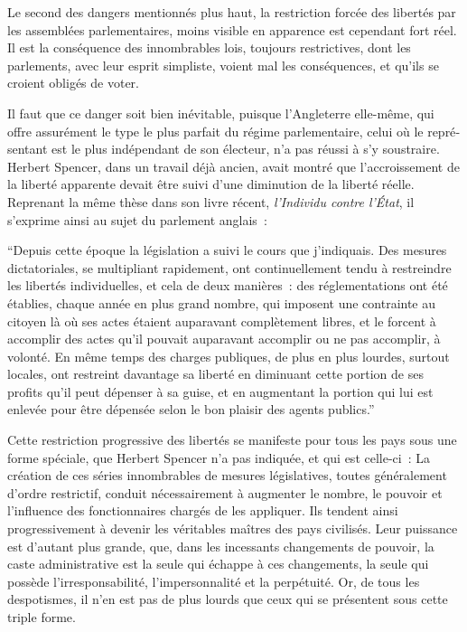 \documentclass[french,twoside]{book} %
\begin{document}
Le second des dangers mentionnés plus haut, la restriction forcée des libertés par les assemblées parlementaires, moins visible en apparence est cependant fort réel. Il est la conséquence des innombrables lois, toujours restrictives, dont les parlements, avec leur esprit simpliste, voient mal les conséquences, et qu’ils se croient obligés de voter.\par
Il faut que ce danger soit bien inévitable, puisque l’Angleterre elle-même, qui offre assurément le type le plus parfait du régime parlementaire, celui où le repré­sentant est le plus indépendant de son électeur, n’a pas réussi à s’y soustraire. Herbert Spencer, dans un travail déjà ancien, avait montré que l’accroissement de la liberté apparente devait être suivi d’une diminution de la liberté réelle. Reprenant la même thèse dans son livre récent, \emph{l’Individu contre l’État}, il s’exprime ainsi au sujet du parlement anglais :\par
“Depuis cette époque la législation a suivi le cours que j’indiquais. Des mesures dictatoriales, se multipliant rapidement, ont continuellement tendu à restreindre les libertés individuelles, et cela de deux manières : des réglementations ont été établies, chaque année en plus grand nombre, qui imposent une contrainte au citoyen là où ses actes étaient auparavant complètement libres, et le forcent à accomplir des actes qu’il pouvait auparavant accomplir ou ne pas accomplir, à volonté. En même temps des charges publiques, de plus en plus lourdes, surtout locales, ont restreint davantage sa liberté en diminuant cette portion de ses profits qu’il peut dépenser à sa guise, et en augmentant la portion qui lui est enlevée pour être dépensée selon le bon plaisir des agents publics.”\par
Cette restriction progressive des libertés se manifeste pour tous les pays sous une forme spéciale, que Herbert Spencer n’a pas indiquée, et qui est celle-ci : La création de ces séries innombrables de mesures législatives, toutes généralement d’ordre restrictif, conduit nécessairement à augmenter le nombre, le pouvoir et l’influence des fonctionnaires chargés de les appliquer. Ils tendent ainsi progressivement à devenir les véritables maîtres des pays civilisés. Leur puissance est d’autant plus grande, que, dans les incessants changements de pou­voir, la caste administrative est la seule qui échappe à ces changements, la seule qui possède l’irresponsabilité, l’impersonnalité et la perpétuité. Or, de tous les despotismes, il n’en est pas de plus lourds que ceux qui se présentent sous cette triple forme.\par
\end{document}
